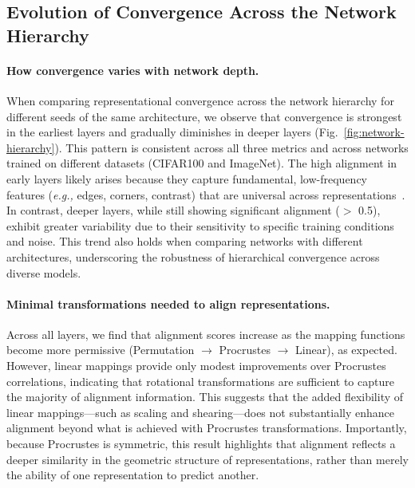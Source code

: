 \subsection{Evolution of Convergence Across the Network Hierarchy}
\label{sec: convergence-evolution}



\paragraph{How convergence varies with network depth.}
When comparing representational convergence across the network hierarchy for different seeds of the same architecture, we observe that convergence is strongest in the earliest layers and gradually diminishes in deeper layers (Fig.~\ref{fig:network-hierarchy}). This pattern is consistent across all three metrics and across networks trained on different datasets (CIFAR100 and ImageNet). The high alignment in early layers likely arises because they capture fundamental, low-frequency features (\emph{e.g.,} edges, corners, contrast) that are universal across representations~\citep{rahaman2019spectral, bau2017network, zeiler2014visualizing}. In contrast, deeper layers, while still showing significant alignment ($>$ 0.5), exhibit greater variability due to their sensitivity to specific training conditions and noise. This trend also holds when comparing networks with different architectures, underscoring the robustness of hierarchical convergence across diverse models.



\paragraph{Minimal transformations needed to align representations.}
Across all layers, we find that alignment scores increase as the mapping functions become more permissive (Permutation $\rightarrow$ Procrustes $\rightarrow$ Linear), as expected. However, linear mappings provide only modest improvements over Procrustes correlations, indicating that rotational transformations are sufficient to capture the majority of alignment information. This suggests that the added flexibility of linear mappings---such as scaling and shearing---does not substantially enhance alignment beyond what is achieved with Procrustes transformations. Importantly, because Procrustes is symmetric, this result highlights that alignment reflects a deeper similarity in the geometric structure of representations, rather than merely the ability of one representation to predict another.



